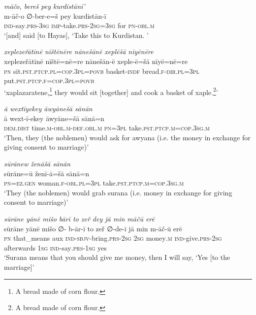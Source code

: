 \ea \label{ŽH.69}
\textit{māčo, bereš pey kurdistānī’} \\ 
\gll m-āč-o ∅-ber-e=š pey kurdistān-ī \\ 
 \textsc{ind-}say\textsc{.prs}\textsc{-3sg} \textsc{imp-}take\textsc{.prs}-\textsc{2sg}\textsc{=3sg} for \textsc{pn}\textsc{-obl}\textsc{.m} \\ 
\glt `[and] said [to Hayas], ‘Take this to Kurdistan. '
\z 
 
\ea \label{RE.24}
\textit{xeplezeřātīnē nīštēnēre nānešānē xeplēšā nīyēnēre} \\ 
\gll xeplezeřātīnē nīštē=nē=re nānešān-ē xeple-ē=šā nīyē=nē=re \\ 
 \textsc{pn} sit\textsc{.pst}\textsc{.ptcp}\textsc{.pl}\textsc{=cop}\textsc{.3pl}\textsc{=\textsc{povb}} basket\textsc{-indf} bread\textsc{.f}\textsc{-dir}\textsc{.pl}\textsc{=3pl} put\textsc{.pst}\textsc{.ptcp}\textsc{.f}\textsc{=cop}\textsc{.3pl}\textsc{=\textsc{povb}} \\ 
\glt `xaplazaratene,\footnote{A bread made of corn flour.} they would sit [together] and cook a basket of xaple.\footnote{A bread made of corn flour.}'
\z 
 
\ea \label{RE.58}
\textit{ā wextīyekey āwyānešā sānān} \\ 
\gll ā wext-ī-ekey āwyāne=šā sānā=n \\ 
 \textsc{dem.dist} time\textsc{.m}\textsc{-obl}\textsc{.m}\textsc{-def}\textsc{.obl}\textsc{.m} \textsc{pn}\textsc{=3pl} take\textsc{.pst}\textsc{.ptcp}\textsc{.m}\textsc{=cop}\textsc{.3sg}\textsc{.m} \\ 
\glt `Then, they (the noblemen) would ask for awyana (i.e. the money in exchange for giving consent to marriage)'
\z 
 
\ea \label{RE.59}
\textit{sūrānew ženāšā sānān} \\ 
\gll sūrāne=ū ženī-ā=šā sānā=n \\ 
 \textsc{pn}\textsc{=ez.gen} woman\textsc{.f}\textsc{-obl}\textsc{.pl}\textsc{=3pl} take\textsc{.pst}\textsc{.ptcp}\textsc{.m}\textsc{=cop}\textsc{.3sg}\textsc{.m} \\ 
\glt `They (the noblemen) would grab surana (i.e. money in exchange for giving consent to marriage)'
\z 
 
\ea \label{RE.60}
\textit{sūrāne yānē mišo bārī to zeř dey jā min māčū erē} \\ 
\gll sūrāne yānē mišo ∅- b-ār-ī to zeř ∅-de-ī jā min m-āč-ū erē \\ 
 \textsc{pn} that\_means aux \textsc{ind-}\textsc{sbjv-}bring\textsc{.prs}-\textsc{2sg} \textsc{2sg} money\textsc{.m} \textsc{ind-}give\textsc{.prs}-\textsc{2sg} afterwards \textsc{1sg} \textsc{ind-}say\textsc{.prs}\textsc{-\textsc{1sg}} yes \\ 
\glt `Surana means that you should give me money, then I will say, ‘Yes [to the marriage]'
\z 
 
